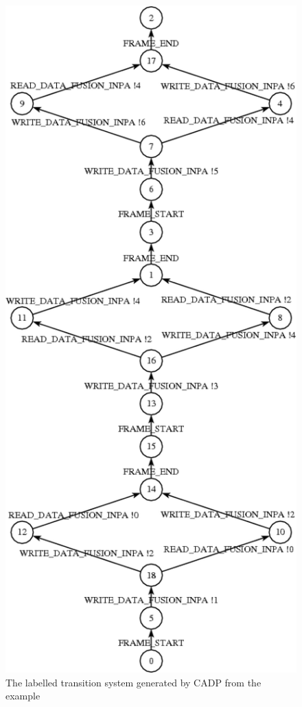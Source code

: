 \begin{figure}
\centering
\includegraphics[scale=0.8]{figs/lotos_lts_ex1}
\caption{The labelled transition system generated by CADP from the example}
\label{fig:lts_ex1}
\end{figure}


